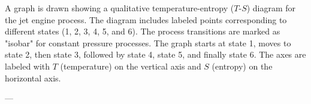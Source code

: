 A graph is drawn showing a qualitative temperature-entropy (\( T \)-\( S \)) diagram for the jet engine process. The diagram includes labeled points corresponding to different states (1, 2, 3, 4, 5, and 6). The process transitions are marked as "isobar" for constant pressure processes. The graph starts at state 1, moves to state 2, then state 3, followed by state 4, state 5, and finally state 6. The axes are labeled with \( T \) (temperature) on the vertical axis and \( S \) (entropy) on the horizontal axis.

---